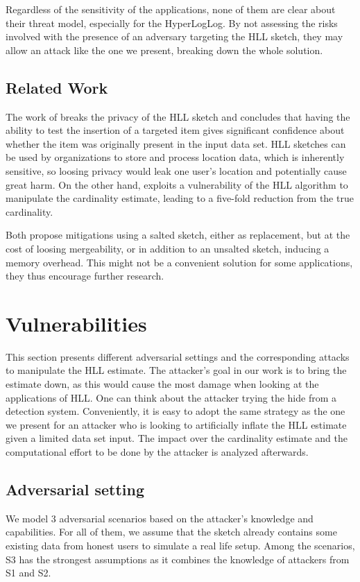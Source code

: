\documentclass{IEEEtran}
\begin{document}
Regardless of the sensitivity of the applications, none of them are clear about their threat model, especially for the HyperLogLog. By not assessing the risks involved with the presence of an adversary targeting the HLL sketch, they may allow an attack like the one we present, breaking down the whole solution.

\subsection{Related Work}
The work of \cite{cardestprivacy} breaks the privacy of the HLL sketch and concludes that having the ability to test the insertion of a targeted item gives significant confidence about whether the item was originally present in the input data set. HLL sketches can be used by organizations to store and process location data, which is inherently sensitive, so loosing privacy would leak one user's location and potentially cause great harm. On the other hand, \cite{hllvuln} exploits a vulnerability of the HLL algorithm to manipulate the cardinality estimate, leading to a five-fold reduction from the true cardinality.

Both propose mitigations using a salted sketch, either as replacement, but at the cost of loosing mergeability, or in addition to an unsalted sketch, inducing a memory overhead. This might not be a convenient solution for some applications, they thus encourage further research. 

\section{Vulnerabilities}
This section presents different adversarial settings and the corresponding attacks to manipulate the HLL estimate. The attacker's goal in our work is to bring the estimate down, as this would cause the most damage when looking at the applications of HLL. One can think about the attacker trying the hide from a detection system. Conveniently, it is easy to adopt the same strategy as the one we present for an attacker who is looking to artificially inflate the HLL estimate given a limited data set input. The impact over the cardinality estimate and the computational effort to be done by the attacker is analyzed afterwards. 

\subsection{Adversarial setting}
We model 3 adversarial scenarios based on the attacker's knowledge and capabilities. For all of them, we assume that the sketch already contains some existing data from honest users to simulate a real life setup. Among the scenarios, S3 has the strongest assumptions as it combines the knowledge of attackers from S1 and S2.
\end{document}
